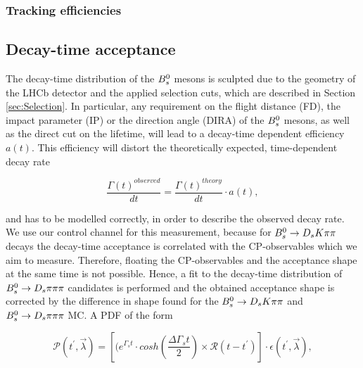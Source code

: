 \clearpage
\subsubsection{Tracking efficiencies}

\clearpage

\subsection{Decay-time acceptance}
\label{sec:timeAcceptance}
The decay-time distribution of the ${{B}^0_{s}}$ mesons is sculpted due to the geometry of the LHCb detector and the applied selection cuts, which are described in Section \ref{sec:Selection}.
In particular, any requirement on the flight distance (FD), the impact parameter (IP) or the direction angle (DIRA) of the ${{B}^0_{s}}$ mesons, as well as the direct cut on the lifetime, will lead to a decay-time dependent efficiency $a(t)$. This efficiency will distort the theoretically expected, time-dependent decay rate

\begin{equation}
\frac{\Gamma(t)^{observed}}{dt} = \frac{\Gamma(t)^{theory}}{dt} \cdot a(t),
\label{eq:DecRateAcc}
\end{equation} 

and has to be modelled correctly, in order to describe the observed decay rate. We use our control channel for this measurement, because for ${{B}^0_{s}}\rightarrow{\ensuremath{{D}_{s}}}{\ensuremath{K}}{\ensuremath{\pi}}{\ensuremath{\pi}}$ decays the decay-time acceptance is correlated with the CP-observables which we aim to measure. Therefore, floating the CP-observables and the acceptance shape at the same time is not possible. 
Hence, a fit to the decay-time distribution of ${{B}^0_{s}}\rightarrow{\ensuremath{{D}_{s}}}{\ensuremath{\pi}}{\ensuremath{\pi}}{\ensuremath{\pi}}$ candidates is performed and the obtained acceptance shape is corrected by the difference in shape found for the ${{B}^0_{s}}\rightarrow{\ensuremath{{D}_{s}}}{\ensuremath{K}}{\ensuremath{\pi}}{\ensuremath{\pi}}$ and ${{B}^0_{s}}\rightarrow{\ensuremath{{D}_{s}}}{\ensuremath{\pi}}{\ensuremath{\pi}}{\ensuremath{\pi}}$ MC. \newline
A PDF of the form

\begin{equation}
\mathcal{P}(t^{'},\vec{\lambda}) = \left[ (e^{\Gamma_{s}t}\cdot cosh(\frac{\Delta\Gamma_{s}t}{2}) \times \mathcal{R}(t - t^{'})\right] \cdot \epsilon(t^{'}, \vec{\lambda}),
\label{eq:AccPDF}
\end{equation}

